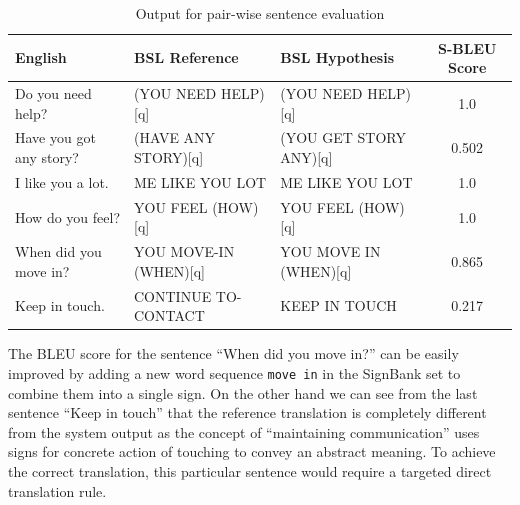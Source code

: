 \documentclass[12pt]{ociamthesis}  %
\begin{document}
\begin{table}[H]
\center
\footnotesize
\begin{tabular}{l >{\ttfamily}l >{\ttfamily}l c}
\hline
English & {\fontfamily{\familydefault}\selectfont BSL Reference} & {\fontfamily{\familydefault}\selectfont BSL Hypothesis} & S-BLEU Score \\
\hline
Do you need help? & (YOU NEED HELP)[q] & \color{com} (YOU NEED HELP)[q] & 1.0 \\
Have you got any story? & (HAVE ANY STORY)[q] & \color{red} (YOU GET STORY ANY)[q] & 0.502 \\
I like you a lot. & ME LIKE YOU LOT & \color{com} ME LIKE YOU LOT & 1.0 \\
How do you feel? & YOU FEEL (HOW)[q] &  \color{com}YOU FEEL (HOW)[q] & 1.0 \\ 
When did you move in? & YOU MOVE-IN (WHEN)[q] & \color{red} YOU MOVE IN (WHEN)[q] & 0.865 \\
Keep in touch. & CONTINUE TO-CONTACT & \color{red} KEEP IN TOUCH & 0.217 \\
\hline
\end{tabular}
\caption{Output for pair-wise sentence evaluation}
\label{table:smoothed}
\end{table}
The BLEU score for the sentence ``When did you move in?'' can be easily improved by adding a new word sequence \texttt{move in} in the SignBank set to combine them into a single sign. On the other hand we can see from the last sentence ``Keep in touch'' that the reference translation is completely different from the system output as the concept of ``maintaining communication'' uses signs for concrete action of touching to convey an abstract meaning. To achieve the correct translation, this particular sentence would require a targeted direct translation rule.
\end{document}
